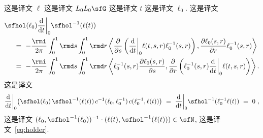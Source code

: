 \documentclass[
    affil-it, %
    auth-lg, %
    british, %
    compression, %
    contents, %
    custom-packages={}, %
    references={bigone}, %
]{lib/preprint}
\begin{document}
\begin{body}
 这是译文 $ \ell $ 这是译文 $ L_0 L_0 \sfG $ 这是译文 $ t $ 这是译文 $ \ell_0$. 这是译文 
        \begin{equation}\label{eq:holderhol}
            \begin{aligned}
                &\sfhol(\ell_0)\dder{t}\bigg|_0\sfhol^{-1}(\ell(t)) 
                \\
                &\kern.5cm=\ -\frac{\rmi}{2\pi}\int_0^1\rmd s\int_0^1\rmd r\innerLarge{\parder{s}\left(\dder{t}\bigg|_0\ell(t,s,r)\ell_0^{-1}(s,r)\right)}{\parder[\ell_0(s,r)]{r}\ell_0^{-1}(s,r)}
                \\
                &\kern.5cm=\ -\frac{\rmi}{2\pi}\int_0^1\rmd s\int_0^1\rmd r\innerLarge{\ell_0^{-1}(s,r)\parder[\ell_0(s,r)]{s}}{\parder{r}\left(\ell_0^{-1}(s,r)\dder{t}\bigg|_0\ell(t,s,r)\right)}.
            \end{aligned}
        \end{equation}  这是译文         \begin{equation}
            \dder{t}\bigg|_0\big(\sfhol(\ell_0)\,\sfhol^{-1}(\ell(t))\,c^{-1}(\ell_0,\ell_0^{-1})\,c(\ell_0^{-1},\ell(t))\big)\ =\ \dder{t}\bigg|_0\sfhol^{-1}(\ell_0^{-1}\ell(t))\ =\ 0~,
        \end{equation}  这是译文 $ (\ell_0, \sfhol^{-1}(\ell_0))^{-1}\cdot (\ell(t),\sfhol^{-1}(\ell(t))) \in \sfN $, 这是译文~\eqref{eq:holder}.
        

\end{body}
\end{document}
